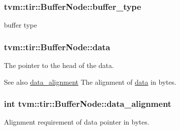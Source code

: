 \subsubsection[{\texorpdfstring{buffer\+\_\+type}{buffer_type}}]{ tvm\+::tir\+::\+Buffer\+Node\+::buffer\+\_\+type}\hypertarget{classtvm_1_1tir_1_1BufferNode_a2ce595dfcf7a726c7e0f86a6942d2568}{}\label{classtvm_1_1tir_1_1BufferNode_a2ce595dfcf7a726c7e0f86a6942d2568}


buffer type 

\subsubsection[{\texorpdfstring{data}{data}}]{ tvm\+::tir\+::\+Buffer\+Node\+::data}\hypertarget{classtvm_1_1tir_1_1BufferNode_a2d6bbcf9ccfa6e449fb024fa1bff4e3b}{}\label{classtvm_1_1tir_1_1BufferNode_a2d6bbcf9ccfa6e449fb024fa1bff4e3b}


The pointer to the head of the data. 

\begin{DoxySeeAlso}{See also}
\hyperlink{classtvm_1_1tir_1_1BufferNode_aac30fc17abe8bde34272a854ba74b16a}{data\+\_\+alignment} The alignment of \hyperlink{classtvm_1_1tir_1_1BufferNode_a2d6bbcf9ccfa6e449fb024fa1bff4e3b}{data} in bytes. 
\end{DoxySeeAlso}
\subsubsection[{\texorpdfstring{data\+\_\+alignment}{data_alignment}}]{\setlength{\rightskip}{0pt plus 5cm}int tvm\+::tir\+::\+Buffer\+Node\+::data\+\_\+alignment}\hypertarget{classtvm_1_1tir_1_1BufferNode_aac30fc17abe8bde34272a854ba74b16a}{}\label{classtvm_1_1tir_1_1BufferNode_aac30fc17abe8bde34272a854ba74b16a}


Alignment requirement of data pointer in bytes. 

